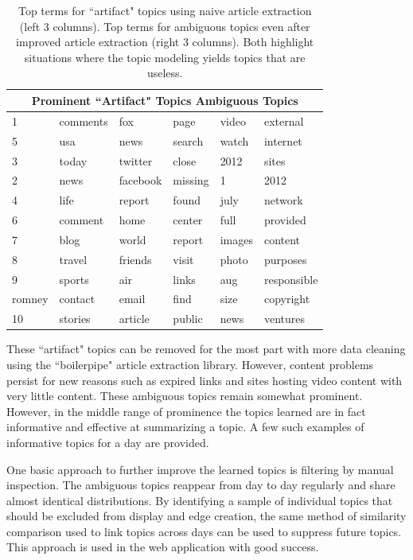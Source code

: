 \documentclass[10pt]{article}
\begin{document}
\begin{table}
\begin{center}
\begin{tabular}{|l|l|l|l|l|l|}
  \hline
  \multicolumn{6}{|c|}{Prominent ``Artifact" Topics \quad\quad\quad\quad\quad\quad Ambiguous Topics} \\
  \hline
1 & comments & fox & page & video & external \\
5 & usa & news & search & watch & internet\\
3 & today & twitter & close & 2012 & sites\\
2 & news & facebook & missing & 1 & 2012 \\
4 & life & report & found & july & network \\
6  & comment & home & center & full & provided \\
7 & blog & world & report & images & content \\
8 & travel & friends & visit & photo & purposes\\
9 & sports & air & links & aug & responsible\\
romney & contact & email & find & size & copyright \\
10 &  stories & article & public & news & ventures \\
\hline
\end{tabular}
\caption*{Top terms for ``artifact" topics using naive article extraction (left 3 columns). Top terms for ambiguous topics even after improved article extraction (right 3 columns).  Both highlight situations where the topic modeling yields topics that are useless.}
\end{center}
\end{table}

These ``artifact" topics can be removed for the most part with more data cleaning using the ``boilerpipe" article extraction library.  However, content problems persist for new reasons such as expired links and sites hosting video content with very little content.  These ambiguous topics remain somewhat prominent.  However, in the middle range of prominence the topics learned are in fact informative and effective at summarizing a topic.  A few such examples of informative topics for a day are provided.

One basic approach to further improve the learned topics is filtering by manual inspection.  The ambiguous topics reappear from day to day regularly and share almost identical distributions.  By identifying a sample of individual topics that should be excluded from display and edge creation, the same method of similarity comparison used to link topics across days can be used to suppress future topics.  This approach is used in the web application with good success.
\end{document}
